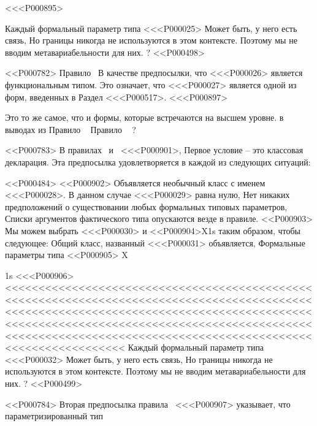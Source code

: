 <<<P000895>{%
Каждый формальный параметр типа <<<P000025> Может быть, у него есть связь,
Но границы никогда не используются в этом контексте.
Поэтому мы не вводим метавариабельности для них.%
?
<<P000498>

<<P000782>%
Правило ~\SrnRightFunction В качестве предпосылки, что <<<P000026> является функциональным типом.
Это означает, что <<<P000027> является одной из форм, введенных в
Раздел <<<P000517>.
<<<P000897>{%
Это то же самое, что и формы, которые встречаются на высшем уровне.
в выводах из
Правило ~\SrnPositionalFunctionType{}
Правило ~\SrnNamedFunctionType%
?

<<P000783>%
В правилах ~\SrnCovariance и ~<<<P000901>,
Первое условие – это классовая декларация.
Эта предпосылка удовлетворяется в каждой из следующих ситуаций:

<<P000484>
<<P000902> Объявляется необычный класс с именем <<<P000028>.
В данном случае <<<P000029> равна нулю,
Нет никаких предположений о существовании
любых формальных типовых параметров,
Списки аргументов фактического типа опускаются везде в правиле.
<<P000903> Мы можем выбрать <<<P000030> и <<P000904>{X}{1}{s} таким образом, чтобы следующее:
Общий класс, названный <<<P000031> объявляется,
Формальные параметры типа <<P000905> X}{1}{s}
<<<P000906><<<<<<<<<<<<<<<<<<<<<<<<<<<<<<<<<<<<<<<<<<<<<<<<<<<<<<<<<<<<<<<<<<<<<<<<<<<<<<<<<<<<<<<<<<<<<<<<<<<<<<<<<<<<<<<<<<<<<<<<<<<<<<<<<<<<<<<<<<<<<<<<<<<<<<<<<<<<<<<<<<<<<<<<<<<<<<<<<<<<<<<<<<<<<<<<<<<<<<<<<<<<<<<<<<<<<<<<<<<<<<<<<<<<<<<<<<<<<<<<<<<<<<<<
Каждый формальный параметр типа <<<P000032> Может быть, у него есть связь,
Но границы никогда не используются в этом контексте.
Поэтому мы не вводим метавариабельности для них.%
?
<<P000499>

<<P000784>%
Вторая предпосылка правила ~<<<P000907> указывает, что
параметризированный тип }
